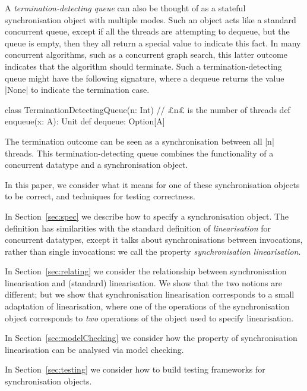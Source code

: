 A \emph{termination-detecting queue} can also be thought of as a stateful
synchronisation object with multiple modes.  Such an object acts like a
standard concurrent queue, except if all the threads are attempting to
dequeue, but the queue is empty, then they all return a special value to
indicate this fact.  In many concurrent algorithms, such as a concurrent graph
search, this latter outcome indicates that the algorithm should terminate.
Such a termination-detecting queue might have the following signature, where a
dequeue returns the value |None| to indicate the termination case.
%
\begin{scala}
class TerminationDetectingQueue(n: Int){ // £n£ is the number of threads   
  def enqueue(x: A): Unit
  def dequeue: Option[A]
}
\end{scala} 
%
The termination outcome can be seen as a synchronisation between all |n|
threads.  This termination-detecting queue combines the functionality of a
concurrent datatype and a synchronisation object.



In this paper, we consider what it means for one of these synchronisation
objects to be correct, and techniques for testing correctness.  

In Section~\ref{sec:spec} we describe how to specify a synchronisation
object.  The definition has similarities with the standard definition of
\emph{linearisation} for concurrent datatypes, except it talks about
synchronisations between invocations, rather than single invocations: we call
the property \emph{synchronisation linearisation}. 

In Section~\ref{sec:relating} we consider the relationship between
synchronisation linearisation and (standard) linearisation.  We show that the
two notions are different; but we show that synchronisation linearisation
corresponds to a small adaptation of linearisation, where one of the
operations of the synchronisation object corresponds to \emph{two} operations
of the object used to specify linearisation.  

In Section~\ref{sec:modelChecking} we consider how the property of
synchronisation linearisation can be analysed via model checking.  

In Section~\ref{sec:testing} we consider how to build testing frameworks for
synchronisation objects. 
